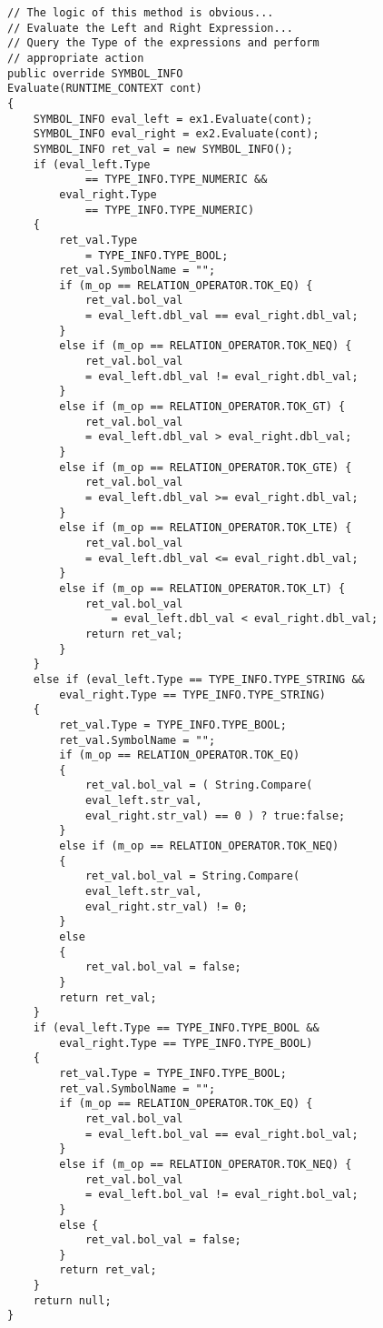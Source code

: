 \lstset{style=csharp}
\begin{lstlisting}
// The logic of this method is obvious...
// Evaluate the Left and Right Expression...
// Query the Type of the expressions and perform
// appropriate action
public override SYMBOL_INFO 
Evaluate(RUNTIME_CONTEXT cont)
{
	SYMBOL_INFO eval_left = ex1.Evaluate(cont);
	SYMBOL_INFO eval_right = ex2.Evaluate(cont);
	SYMBOL_INFO ret_val = new SYMBOL_INFO();
	if (eval_left.Type 
			== TYPE_INFO.TYPE_NUMERIC &&
		eval_right.Type 
			== TYPE_INFO.TYPE_NUMERIC)
	{
		ret_val.Type 
			= TYPE_INFO.TYPE_BOOL;
		ret_val.SymbolName = "";
		if (m_op == RELATION_OPERATOR.TOK_EQ) {
			ret_val.bol_val 
			= eval_left.dbl_val == eval_right.dbl_val;
		}
		else if (m_op == RELATION_OPERATOR.TOK_NEQ) {
			ret_val.bol_val 
			= eval_left.dbl_val != eval_right.dbl_val;
		}
		else if (m_op == RELATION_OPERATOR.TOK_GT) {
			ret_val.bol_val 
			= eval_left.dbl_val > eval_right.dbl_val;
		}
		else if (m_op == RELATION_OPERATOR.TOK_GTE) {
			ret_val.bol_val 
			= eval_left.dbl_val >= eval_right.dbl_val;
		}
		else if (m_op == RELATION_OPERATOR.TOK_LTE) {
			ret_val.bol_val 
			= eval_left.dbl_val <= eval_right.dbl_val;
		}
		else if (m_op == RELATION_OPERATOR.TOK_LT) {
			ret_val.bol_val 
				= eval_left.dbl_val < eval_right.dbl_val;
			return ret_val;
		}
	}
	else if (eval_left.Type == TYPE_INFO.TYPE_STRING &&
		eval_right.Type == TYPE_INFO.TYPE_STRING)
	{
		ret_val.Type = TYPE_INFO.TYPE_BOOL;
		ret_val.SymbolName = "";
		if (m_op == RELATION_OPERATOR.TOK_EQ)
		{
			ret_val.bol_val = ( String.Compare(
			eval_left.str_val,
			eval_right.str_val) == 0 ) ? true:false;
		}
		else if (m_op == RELATION_OPERATOR.TOK_NEQ)
		{
			ret_val.bol_val = String.Compare(
			eval_left.str_val,
			eval_right.str_val) != 0;
		}
		else
		{
			ret_val.bol_val = false;
		}
		return ret_val;
	}
	if (eval_left.Type == TYPE_INFO.TYPE_BOOL &&
		eval_right.Type == TYPE_INFO.TYPE_BOOL)
	{
		ret_val.Type = TYPE_INFO.TYPE_BOOL;
		ret_val.SymbolName = "";
		if (m_op == RELATION_OPERATOR.TOK_EQ) {
			ret_val.bol_val
			= eval_left.bol_val == eval_right.bol_val;
		}
		else if (m_op == RELATION_OPERATOR.TOK_NEQ) {
			ret_val.bol_val
			= eval_left.bol_val != eval_right.bol_val;
		}
		else {
			ret_val.bol_val = false;
		}
		return ret_val;
	}
	return null;
}
\end{lstlisting}
